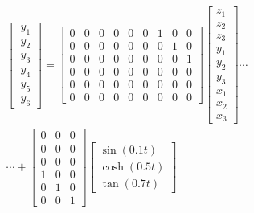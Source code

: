 \documentclass[letterpaper, 12pt]{article}
\begin{document}
\begin{enumerate}
\begin{enumerate}
\begin{multline*}
\begin{bmatrix}
\ y_1\\ 
\ y_2\\ 
\ y_3\\ 
\ y_4\\ 
\ y_5\\ 
\ y_6
\end{bmatrix}
=
\begin{bmatrix}
0 &0  &0  &0  &0  &0  &1  &0  &0 \\ 
0 &0  &0  &0  &0  &0  &0  &1  &0 \\ 
0 &0  &0  &0  &0  &0  &0  &0  &1 \\ 
0 &0  &0  &0  &0  &0  &0  &0  &0 \\ 
0 &0  &0  &0  &0  &0  &0  &0  &0 \\ 
0 &0  &0  &0  &0  &0  &0  &0  &0 
\end{bmatrix}
\begin{bmatrix}
z_1\\ 
z_2\\ 
z_3\\ 
y_1\\ 
y_2\\ 
y_3\\ 
x_1\\ 
x_2\\ 
x_3
\end{bmatrix}
\cdots \\
\cdots +
\begin{bmatrix}
0  &0  &0 \\
0  &0  &0 \\
0  &0  &0 \\
1  &0  &0 \\
0  &1  &0 \\
0  &0  &1 
\end{bmatrix}
\begin{bmatrix}
\sin(0.1t)\\ 
\cosh(0.5t)\\ 
\tan(0.7t)
\end{bmatrix}
\end{multline*}










\end{enumerate}
\end{enumerate}
\end{document}

